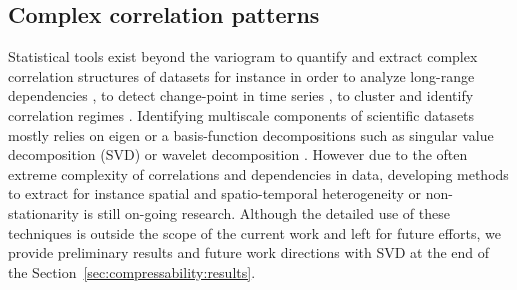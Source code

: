 \documentclass[conference]{IEEEtran}
\begin{document}
\subsection{Complex correlation patterns} 
Statistical tools exist beyond the variogram to quantify and extract complex correlation structures of datasets for instance in order to analyze long-range dependencies \cite{abry1998}, to detect change-point in time  series \cite{cabrieto2017}, to cluster and identify correlation regimes \cite{bessac2016}. 
Identifying multiscale components of scientific datasets mostly relies on eigen or a basis-function decompositions  such  as  singular value decomposition (SVD) or wavelet decomposition \cite{addison2017,hannachi2007}. 
However due to the often extreme complexity of correlations and dependencies in data, developing methods to extract for instance spatial and spatio-temporal heterogeneity  or non-stationarity is still on-going research. 
Although the detailed use of these techniques is outside the scope of the current work and left for future efforts, we provide preliminary results  and future work  directions with SVD at the end of the Section~\ref{sec:compressability:results}. 

 
 
\end{document}
